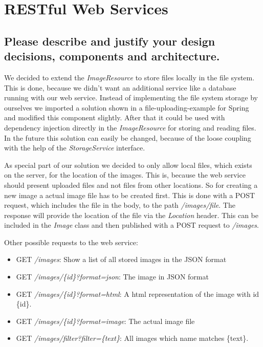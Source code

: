 
\section{RESTful Web Services}
\subsection{Please describe and justify your design decisions, components and
architecture.}

We decided to extend the \textit{ImageResource} to store files locally in the file system. This is done, because we didn't want an additional service like a database running with our web service. Instead of implementing the file system storage by ourselves we imported a solution shown in a file-uploading-example for Spring and modified this component slightly. After that it could be used with dependency injection directly in the \textit{ImageResource} for storing and reading files. In the future this solution can easily be changed, because of the loose coupling with the help of the \textit{StorageService} interface.

As special part of our solution we decided to only allow local files, which exists on the server, for the location of the images. This is, because the web service should present uploaded files and not files from other locations. So for creating a new image a actual image file has to be created first. This is done with a POST request, which includes the file in the body, to the path \textit{/images/file}. The response will provide the location of the file via the \textit{Location} header. This can be included in the \textit{Image} class and then published with a POST request to \textit{/images}.

Other possible requests to the web service:
\begin{itemize}
    \item GET \textit{/images}: Show a list of all stored images in the JSON format
    \item GET \textit{/images/\{id\}?format=json}: The image in JSON format
    \item GET \textit{/images/\{id\}?format=html}: A html representation of the image with id \{id\}.
    \item GET \textit{/images/\{id\}?format=image}: The actual image file
    \item GET \textit{/images/filter?filter=\{text\}}: All images which name matches \{text\}.
\end{itemize}

